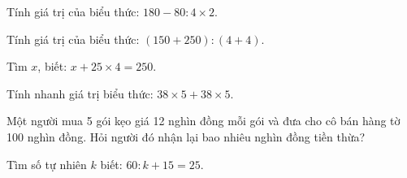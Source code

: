\begin{ex} %
Tính giá trị của biểu thức: $180 - 80 : 4 \times 2$.
\end{ex}

\begin{ex} %
Tính giá trị của biểu thức: $(150 + 250) : (4 + 4)$.
\end{ex}

\begin{ex} %
Tìm $x$, biết: $x + 25 \times 4 = 250$.
\end{ex}

\begin{ex} %
Tính nhanh giá trị biểu thức: $38 \times 5 + 38 \times 5$.
\end{ex}

\begin{ex} %
Một người mua 5 gói kẹo giá 12 nghìn đồng mỗi gói và đưa cho cô bán hàng tờ 100 nghìn đồng. Hỏi người đó nhận lại bao nhiêu nghìn đồng tiền thừa?
\end{ex}

\begin{ex} %
Tìm số tự nhiên $k$ biết: $60 : k + 15 = 25$.
\end{ex}
